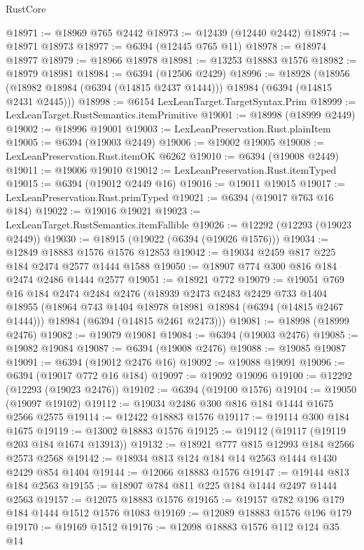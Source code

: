 \begin{lexlean}{RustCore}
\begin{coremodule}
@18971 := @18969 @765 @2442
@18973 := @12439 (@12440 @2442)
@18974 := @18971 @18973
@18977 := @6394 (@12445 @765 @11)
@18978 := @18974 @18977
@18979 := @18966 @18978
@18981 := @13253 @18883 @1576
@18982 := @18979 @18981
@18984 := @6394 (@12506 @2429)
@18996 := @18928
    (@18956 (@18982 @18984 (@6394 (@14815 @2437 @1444))) @18984 (@6394 (@14815 @2431 @2445)))
@18998 := @6154 LexLeanTarget.TargetSyntax.Prim
@18999 := LexLeanTarget.RustSemantics.itemPrimitive
@19001 := @18998 (@18999 @2449)
@19002 := @18996 @19001
@19003 := LexLeanPreservation.Rust.plainItem
@19005 := @6394 (@19003 @2449)
@19006 := @19002 @19005
@19008 := LexLeanPreservation.Rust.itemOK @6262
@19010 := @6394 (@19008 @2449)
@19011 := @19006 @19010
@19012 := LexLeanPreservation.Rust.itemTyped
@19015 := @6394 (@19012 @2449 @16)
@19016 := @19011 @19015
@19017 := LexLeanPreservation.Rust.primTyped
@19021 := @6394 (@19017 @763 @16 @184)
@19022 := @19016 @19021
@19023 := LexLeanTarget.RustSemantics.itemFallible
@19026 := @12292 (@12293 (@19023 @2449))
@19030 := @18915 (@19022 (@6394 (@19026 @1576)))
@19034 := @12849 @18883 @1576 @1576 @12853
@19042 := @19034 @2459 @817 @225 @184 @2474 @2577 @1444 @1588
@19050 := @18907 @774 @300 @816 @184 @2474 @2486 @1444 @2577
@19051 := @18921 @772
@19079 := @19051
    @769
    @16
    @184
    @2474
    @2484
    @2476
    (@18939
      @2473
      @2483
      @2429
      @733
      @1404
      @18955
      (@18964 @743 @1404 @18978 @18981 @18984 (@6394 (@14815 @2467 @1444)))
      @18984
      (@6394 (@14815 @2461 @2473)))
@19081 := @18998 (@18999 @2476)
@19082 := @19079 @19081
@19084 := @6394 (@19003 @2476)
@19085 := @19082 @19084
@19087 := @6394 (@19008 @2476)
@19088 := @19085 @19087
@19091 := @6394 (@19012 @2476 @16)
@19092 := @19088 @19091
@19096 := @6394 (@19017 @772 @16 @184)
@19097 := @19092 @19096
@19100 := @12292 (@12293 (@19023 @2476))
@19102 := @6394 (@19100 @1576)
@19104 := @19050 (@19097 @19102)
@19112 := @19034 @2486 @300 @816 @184 @1444 @1675 @2566 @2575
@19114 := @12422 @18883 @1576
@19117 := @19114 @300 @184 @1675
@19119 := @13002 @18883 @1576
@19125 := @19112 (@19117 (@19119 @203 @184 @1674 @13913))
@19132 := @18921 @777 @815 @12993 @184 @2566 @2573 @2568
@19142 := @18934 @813 @124 @184 @14 @2563 @1444 @1430 @2429 @854 @1404
@19144 := @12066 @18883 @1576
@19147 := @19144 @813 @184 @2563
@19155 := @18907 @784 @811 @225 @184 @1444 @2497 @1444 @2563
@19157 := @12075 @18883 @1576
@19165 := @19157 @782 @196 @179 @184 @1444 @1512 @1576 @1083
@19169 := @12089 @18883 @1576 @196 @179
@19170 := @19169 @1512
@19176 := @12098 @18883 @1576 @112 @124 @35 @14

\end{coremodule}
\end{lexlean}
